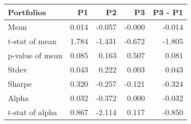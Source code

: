 \begin{tabular}{lrrrr}
\toprule
Portfolios & P1 & P2 & P3 & P3 - P1 \\
\midrule
Mean & 0.014 & -0.057 & -0.000 & -0.014 \\
t-stat of mean & 1.784 & -1.431 & -0.672 & -1.805 \\
p-value of mean & 0.085 & 0.163 & 0.507 & 0.081 \\
Stdev & 0.043 & 0.222 & 0.003 & 0.043 \\
Sharpe & 0.320 & -0.257 & -0.121 & -0.324 \\
Alpha & 0.032 & -0.372 & 0.000 & -0.032 \\
t-stat of alpha & 0.867 & -2.114 & 0.117 & -0.850 \\
\bottomrule
\end{tabular}
